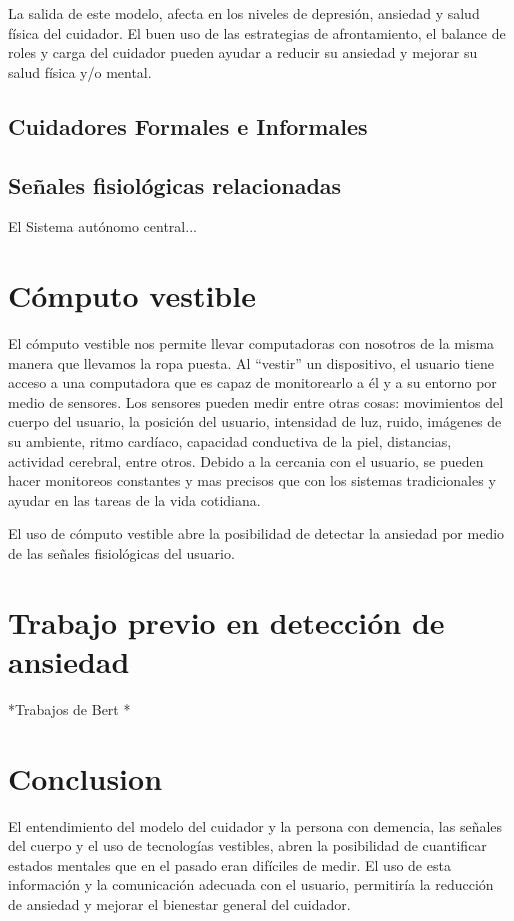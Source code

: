 	La salida de este modelo, afecta en los niveles de depresi\'on, ansiedad y salud f\'isica del cuidador. El buen uso de las estrategias de afrontamiento, el balance de roles y carga del cuidador pueden ayudar a reducir su ansiedad y mejorar su salud f\'isica y/o mental.

\subsection{Cuidadores Formales e Informales}\label{secc:caregivers}


\subsection{Se\~nales fisiol\'ogicas relacionadas}
El Sistema aut\'onomo central...
\section{C\'omputo vestible}\label{secc:dementia}
El c\'omputo vestible nos permite llevar computadoras con nosotros de la misma manera que llevamos la ropa puesta. Al ``vestir'' un dispositivo, el usuario tiene acceso a una computadora que es capaz de monitorearlo a \'el y a su entorno por medio de sensores. Los sensores pueden medir entre otras cosas: movimientos del cuerpo del usuario, la posici\'on del usuario, intensidad de luz, ruido, im\'agenes de su ambiente, ritmo card\'iaco, capacidad conductiva de la piel, distancias, actividad cerebral, entre otros. Debido a la cercania con el usuario, se pueden hacer monitoreos constantes y mas precisos que con los sistemas tradicionales y ayudar en las tareas de la vida cotidiana.

El uso de c\'omputo vestible abre la posibilidad de detectar la ansiedad por medio de las se\~nales fisiol\'ogicas del usuario.

\section{Trabajo previo en detecci\'on de ansiedad}

*Trabajos de Bert
*
\section{Conclusion}\label{secc:conclution}
El entendimiento del modelo del cuidador y la persona con demencia, las se\~nales del cuerpo y el uso de tecnolog\'ias vestibles, abren la posibilidad de cuantificar estados mentales que en el pasado eran dif\'iciles de medir. El uso de esta informaci\'on y la comunicaci\'on adecuada con el usuario, permitir\'ia la reducci\'on de ansiedad y mejorar el bienestar general del cuidador.

\newpage
